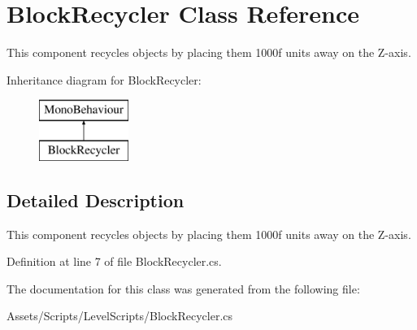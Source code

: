\hypertarget{class_block_recycler}{\section{Block\+Recycler Class Reference}
\label{class_block_recycler}
}


This component recycles objects by placing them 1000f units away on the Z-\/axis.  


Inheritance diagram for Block\+Recycler\+:\begin{figure}[H]
\begin{center}
\leavevmode
\includegraphics[height=2.000000cm]{class_block_recycler}
\end{center}
\end{figure}


\subsection{Detailed Description}
This component recycles objects by placing them 1000f units away on the Z-\/axis. 



Definition at line 7 of file Block\+Recycler.\+cs.



The documentation for this class was generated from the following file\+:\begin{DoxyCompactItemize}
\item 
Assets/\+Scripts/\+Level\+Scripts/Block\+Recycler.\+cs\end{DoxyCompactItemize}
